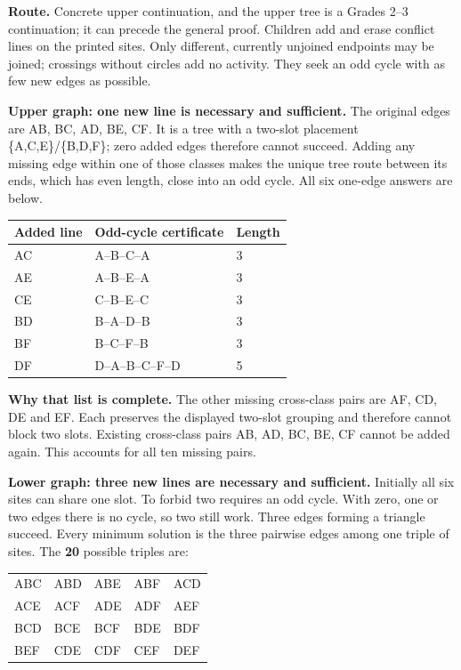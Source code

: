 \documentclass[10pt,letterpaper]{article}
\newcommand{\topic}[1]{\vspace{3pt}{\large\bfseries #1}\par}
\newcommand{\labelled}[2]{\textbf{#1} #2\par}
\newcommand{\route}[1]{\textbf{Route.} #1\par}
\begin{document}
\newpage
\topic{Student p. 6 / Problem 6: create the smallest obstruction}
\route{Concrete upper continuation, and the upper tree is a Grades 2--3 continuation; it can precede the general proof. Children add and erase conflict lines on the printed sites. Only different, currently unjoined endpoints may be joined; crossings without circles add no activity. They seek an odd cycle with as few new edges as possible.}
\labelled{Upper graph: one new line is necessary and sufficient.}{The original edges are AB, BC, AD, BE, CF. It is a tree with a two-slot placement \{A,C,E\}/\{B,D,F\}; zero added edges therefore cannot succeed. Adding any missing edge within one of those classes makes the unique tree route between its ends, which has even length, close into an odd cycle. All six one-edge answers are below.}
\begin{tabularx}{\linewidth}{@{}p{1in}Xp{1.35in}@{}}
\toprule
Added line & Odd-cycle certificate & Length \\
\midrule
AC & A--B--C--A & 3 \\
AE & A--B--E--A & 3 \\
CE & C--B--E--C & 3 \\
BD & B--A--D--B & 3 \\
BF & B--C--F--B & 3 \\
DF & D--A--B--C--F--D & 5 \\
\bottomrule
\end{tabularx}\par\smallskip
\labelled{Why that list is complete.}{The other missing cross-class pairs are AF, CD, DE and EF. Each preserves the displayed two-slot grouping and therefore cannot block two slots. Existing cross-class pairs AB, AD, BC, BE, CF cannot be added again. This accounts for all ten missing pairs.}
\labelled{Lower graph: three new lines are necessary and sufficient.}{Initially all six sites can share one slot. To forbid two requires an odd cycle. With zero, one or two edges there is no cycle, so two still work. Three edges forming a triangle succeed. Every minimum solution is the three pairwise edges among one triple of sites. The \textbf{20} possible triples are:}
\begin{center}
\begin{tabular}{@{}lllll@{}}
ABC & ABD & ABE & ABF & ACD \\
ACE & ACF & ADE & ADF & AEF \\
BCD & BCE & BCF & BDE & BDF \\
BEF & CDE & CDF & CEF & DEF
\end{tabular}
\end{center}
\end{document}
